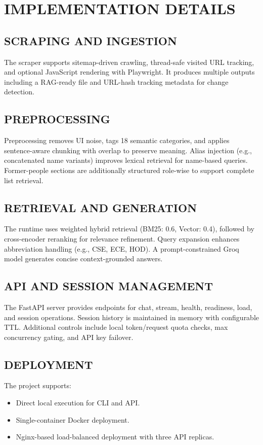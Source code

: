 \documentclass[12pt,a4paper]{report}
\begin{document}
\chapter{IMPLEMENTATION DETAILS}
\thispagestyle{fancy}
\onehalfspacing

\section{SCRAPING AND INGESTION}
The scraper supports sitemap-driven crawling, thread-safe visited URL tracking, and optional JavaScript rendering with Playwright. It produces multiple outputs including a RAG-ready file and URL-hash tracking metadata for change detection.

\section{PREPROCESSING}
Preprocessing removes UI noise, tags 18 semantic categories, and applies sentence-aware chunking with overlap to preserve meaning. Alias injection (e.g., concatenated name variants) improves lexical retrieval for name-based queries. Former-people sections are additionally structured role-wise to support complete list retrieval.

\section{RETRIEVAL AND GENERATION}
The runtime uses weighted hybrid retrieval (BM25: 0.6, Vector: 0.4), followed by cross-encoder reranking for relevance refinement. Query expansion enhances abbreviation handling (e.g., CSE, ECE, HOD). A prompt-constrained Groq model generates concise context-grounded answers.

\section{API AND SESSION MANAGEMENT}
The FastAPI server provides endpoints for chat, stream, health, readiness, load, and session operations. Session history is maintained in memory with configurable TTL. Additional controls include local token/request quota checks, max concurrency gating, and API key failover.

\section{DEPLOYMENT}
The project supports:
\begin{itemize}
    \item Direct local execution for CLI and API.
    \item Single-container Docker deployment.
    \item Nginx-based load-balanced deployment with three API replicas.
\end{itemize}
\end{document}
